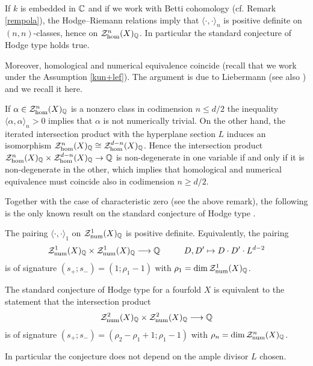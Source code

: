 \documentclass[11pt]{amsart}
\begin{document}
\begin{remark}\label{remHR}
If $k$ is embedded in $\mathbb{C}$ and if we work with Betti cohomology (cf. Remark \ref{rempola}), the Hodge--Riemann relations imply that $\langle \cdot, \cdot \rangle_{n}$  is positive definite on $(n,n)$-classes, hence on $\mathcal{Z}_{\hom}^{n}(X)_{\mathbb{Q}}$. In particular the standard conjecture of Hodge type holds true. 

Moreover, homological and numerical equivalence coincide (recall that we work under the Assumption  \ref{kun+lef}). The argument is due to Liebermann  \cite{Lieb} (see also \cite[Corollary 5.4.2.2]{Andmot}) and we recall it here.

If  $\alpha \in \mathcal{Z}_{\hom}^{n}(X)_{\mathbb{Q}}$ is a nonzero class  in codimension $n\leq d/2$ the inequality  $\langle \alpha, \alpha \rangle_{n}>0$ implies that $\alpha$ is not numerically trivial. On the other hand, the iterated intersection product with the hyperplane section $L$ induces an isomorphism $\mathcal{Z}_{\hom}^{n}(X)_{\mathbb{Q}}\cong \mathcal{Z}_{\hom}^{d-n}(X)_{\mathbb{Q}}$. Hence the intersection product $\mathcal{Z}_{\hom}^{n}(X)_{\mathbb{Q}}\times \mathcal{Z}_{\hom}^{d-n}(X)_{\mathbb{Q}}\rightarrow \mathbb{Q}$ is non-degenerate in one variable if and only if it is non-degenerate in the other, which implies that homological and numerical equivalence must coincide also in codimension $n\geq d/2$.

\end{remark}
Together with the case of characteristic zero (see the above remark), the following is the only known result on the standard conjecture of Hodge type \cite[5.3.2.3]{Andmot}.
\begin{theorem}
The pairing\label{segre} $\langle \cdot, \cdot \rangle_{1}$   on $\mathcal{Z}_{\mathrm{num}}^{1}(X)_{\mathbb{Q}}$ is positive definite. Equivalently, the pairing 
\[\mathcal{Z}^1_{\mathrm{num}}(X)_{\mathbb{Q}}\times \mathcal{Z}_{\mathrm{num}}^1(X)_{\mathbb{Q}} \longrightarrow \mathbb{Q} \hspace{1cm} D,D' \mapsto D\cdot D' \cdot L^{d-2}\]
is of signature  $ (s_+;s_-) = (1;  \rho_1-1)$ with
 $\rho_1=\dim \mathcal{Z}_{\mathrm{num}}^1(X)_{\mathbb{Q}}$.
\end{theorem}
\begin{prop}\label{anypolarization}
The standard conjecture of Hodge type for a fourfold $X$  is equivalent to the statement that the intersection product
\[\mathcal{Z}^2_{\mathrm{num}}(X)_{\mathbb{Q}}\times \mathcal{Z}_{\mathrm{num}}^2(X)_{\mathbb{Q}} \longrightarrow \mathbb{Q}\]
is of signature  $ (s_+;s_-) = ( \rho_2 - \rho_1+1;  \rho_1-1)$ with
 $\rho_n=\dim \mathcal{Z}_{\mathrm{num}}^n(X)_{\mathbb{Q}}$.

In particular the conjecture does not depend on the ample divisor $L$ chosen.
\end{prop}
\end{document}
